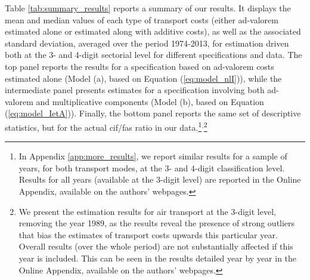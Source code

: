 \documentclass[a4paper,11pt]{article}
\begin{document}
Table \ref{tab:summary_results} reports a summary of our results.
It displays the mean and median values of each type of transport costs (either ad-valorem estimated alone or estimated along with additive costs), as well as the associated standard deviation, averaged over the period 1974-2013, for estimation driven both at the 3- and 4-digit sectorial level for different specifications and data.
The top panel reports the results for a specification based on ad-valorem costs estimated alone (Model (a), based on Equation (\ref{eq:model_nlI})), while the intermediate panel presents estimates for a specification involving both ad-valorem and multiplicative components (Model (b), based on Equation (\ref{eq:model_IetA})).
Finally, the bottom panel reports the same set of descriptive statistics, but for the actual cif/fas ratio in our data.\footnote{In Appendix \ref{app:more_results}, we report similar results for a sample of years, for both transport modes, at the 3- and 4-digit classification level.
Results for all years (available at the 3-digit level) are reported in the Online Appendix, available on the authors' webpages.}$^{,}$\footnote{We present the estimation results for air transport at the 3-digit level, removing the year 1989, as the results reveal the presence of strong outliers that bias the estimates of transport costs upwards this particular year.
Overall results (over the whole period) are not substantially affected if this year is included.
This can be seen in the results detailed year by year in the Online Appendix, available on the authors' webpages.}
\end{document}
